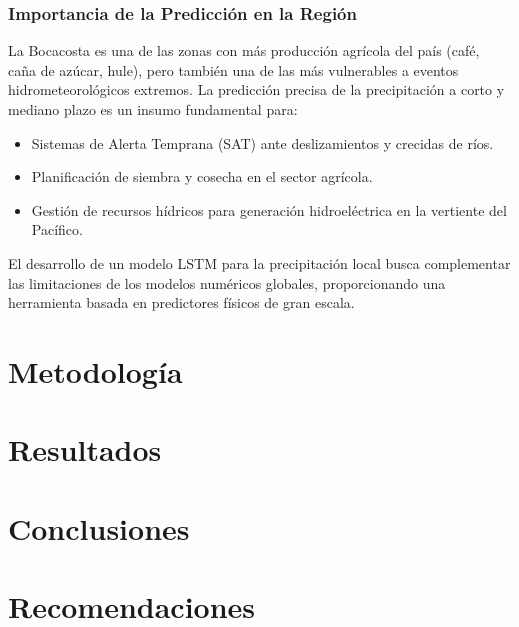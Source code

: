 \documentclass[titlepage,11pt]{report}
\begin{document}
\subsection{Importancia de la Predicción en la Región}
La Bocacosta es una de las zonas con más producción agrícola del país (café, caña de azúcar, hule), pero también una de las más vulnerables a eventos hidrometeorológicos extremos. La predicción precisa de la precipitación a corto y mediano plazo es un insumo fundamental para:
\begin{itemize}
    \item Sistemas de Alerta Temprana (SAT) ante deslizamientos y crecidas de ríos.
    \item Planificación de siembra y cosecha en el sector agrícola.
    \item Gestión de recursos hídricos para generación hidroeléctrica en la vertiente del Pacífico.
\end{itemize}
El desarrollo de un modelo LSTM para la precipitación local busca complementar las limitaciones de los modelos numéricos globales, proporcionando una herramienta basada en predictores físicos de gran escala.





\chapter{Metodología}
\label{sec:metodologia}



\chapter{Resultados}
\label{sec:resultados}



\chapter{Conclusiones}
\label{sec:conclusiones}


\chapter{Recomendaciones}
\label{sec:recomendaciones}

\nocite{*}

\end{document}
